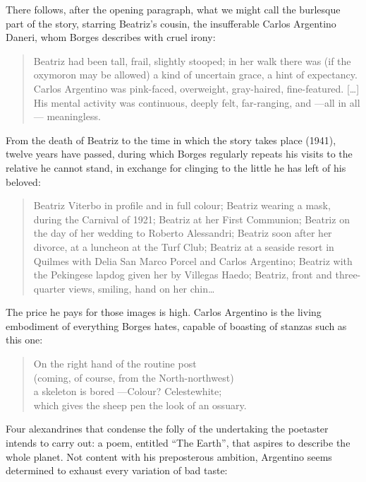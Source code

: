 \documentclass[11pt,a4paper]{article}
\begin{document}
There follows, after the opening paragraph, what we might call the burlesque part of the story, starring Beatriz's cousin, the insufferable Carlos Argentino Daneri, whom Borges describes with cruel irony:

\begin{quotation}
Beatriz had been tall, frail, slightly stooped; in her walk there was (if the oxymoron may be allowed) a kind of uncertain grace, a hint of expectancy. Carlos Argentino was pink-faced, overweight, gray-haired, fine-featured. […] His mental activity was continuous, deeply felt, far-ranging, and ---all in all--- meaningless.
\end{quotation}

From the death of Beatriz to the time in which the story takes place (1941), twelve years have passed, during which Borges regularly repeats his visits to the relative he cannot stand, in exchange for clinging to the little he has left of his beloved:

\begin{quotation}
Beatriz Viterbo in profile and in full colour; Beatriz wearing a mask, during the Carnival of 1921; Beatriz at her First Communion; Beatriz on the day of her wedding to Roberto Alessandri; Beatriz soon after her divorce, at a luncheon at the Turf Club; Beatriz at a seaside resort in Quilmes with Delia San Marco Porcel and Carlos Argentino; Beatriz with the Pekingese lapdog given her by Villegas Haedo; Beatriz, front and three-quarter views, smiling, hand on her chin…
\end{quotation}

The price he pays for those images is high. Carlos Argentino is the living embodiment of everything Borges hates, capable of boasting of stanzas such as this one:

\begin{verse}
On the right hand of the routine post \\
(coming, of course, from the North-northwest) \\
a skeleton is bored ---Colour? Celestewhite; \\
which gives the sheep pen the look of an ossuary.
\end{verse}

Four alexandrines that condense the folly of the undertaking the poetaster intends to carry out: a poem, entitled ``The Earth'', that aspires to describe the whole planet. Not content with his preposterous ambition, Argentino seems determined to exhaust every variation of bad taste:
\end{document}
